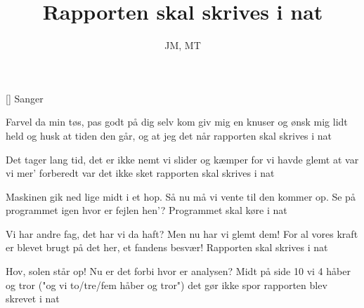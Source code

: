 \documentclass[a4paper,11pt]{article}
\title{Rapporten skal skrives i nat}
\author{JM, MT}
\begin{document}
\maketitle

\begin{roles}
[] Sanger 
\end{roles}

\begin{song}
     Farvel da min tøs,
              pas godt på dig selv
              kom giv mig en knuser
              og ønsk mig lidt held
              og husk at tiden den går,
              og at jeg det når
              rapporten skal skrives i nat 

     Det tager lang tid,
              det er ikke nemt
              vi slider og kæmper
              for vi havde glemt
              at var vi mer' forberedt
              var det ikke sket
              rapporten skal skrives i nat

     Maskinen gik ned
              lige midt i et hop.
              Så nu må vi vente
              til den kommer op.
              Se på programmet igen
              hvor er fejlen hen'?
              Programmet skal køre i nat

     Vi har andre fag,
              det har vi da haft?
              Men nu har vi glemt dem!
              For al vores kraft
              er blevet brugt på det her,
              et fandens besvær!
              Rapporten skal skrives i nat

     Hov, solen står op!
              Nu er det forbi
              hvor er analysen?
              Midt på side 10
              vi 4 håber og tror ("og vi to/tre/fem håber og tror")
              det gør ikke spor
              rapporten blev skrevet i nat
  
\end{song}
\end{document}
